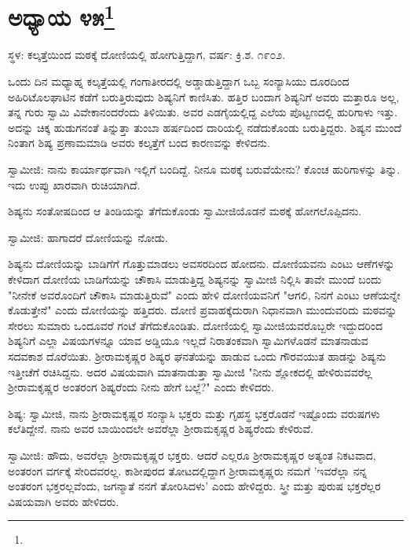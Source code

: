 \newpage

\chapter[ಅಧ್ಯಾಯ ೪೫]{ಅಧ್ಯಾಯ ೪೫\protect\footnote{}}

\begin{center}
ಸ್ಥಳ: ಕಲ್ಕತ್ತೆಯಿಂದ ಮಠಕ್ಕೆ ದೋಣಿಯಲ್ಲಿ ಹೋಗುತ್ತಿದ್ದಾಗ, ವರ್ಷ: ಕ್ರಿ.ಶ. ೧೯೦೨.
\end{center}

ಒಂದು ದಿನ ಮಧ್ಯಾಹ್ನ ಕಲ್ಕತ್ತೆಯಲ್ಲಿ ಗಂಗಾತೀರದಲ್ಲಿ ಅಡ್ಡಾಡುತ್ತಿದ್ದಾಗ ಒಬ್ಬ ಸಂನ್ಯಾಸಿಯು ದೂರದಿಂದ ಅಹಿರಿಟೊಲಘಾಟಿನ ಕಡೆಗೆ ಬರುತ್ತಿರುವುದು ಶಿಷ್ಯನಿಗೆ ಕಾಣಿಸಿತು. ಹತ್ತಿರ ಬಂದಾಗ ಶಿಷ್ಯನಿಗೆ ಅವರು ಮತ್ತಾರೂ ಅಲ್ಲ, ತನ್ನ ಗುರು ಸ್ವಾಮಿ ವಿವೇಕಾನಂದರೆಂದು ತಿಳಿಯಿತು. ಅವರ ಎಡಗೈಯಲ್ಲಿದ್ದ ಎಲೆಯ ಪೊಟ್ಟಣದಲ್ಲಿ ಹುರಿಗಾಳು ಇತ್ತು. ಅದನ್ನು ಚಿಕ್ಕ ಹುಡುಗನಂತೆ ತಿನ್ನುತ್ತಾ ತುಂಬಾ ಹರ್ಷದಿಂದ ದಾರಿಯಲ್ಲಿ ನಡೆದುಕೊಂಡು ಬರುತ್ತಿದ್ದರು. ಶಿಷ್ಯನ ಮುಂದೆ ನಿಂತಾಗ ಶಿಷ್ಯ ಪ್ರಣಾಮಮಾಡಿ ಅವರು ಕಲ್ಕತ್ತೆಗೆ ಬಂದ ಕಾರಣವನ್ನು ಕೇಳಿದನು.

ಸ್ವಾಮೀಜಿ: ನಾನು ಕಾರ್ಯಾರ್ಥವಾಗಿ ಇಲ್ಲಿಗೆ ಬಂದಿದ್ದೆ. ನೀನೂ ಮಠಕ್ಕೆ ಬರುವೆಯೇನು? ಕೊಂಚ ಹುರಿಗಾಳನ್ನು ತಿನ್ನು. ಇದು ಉಪ್ಪು ಖಾರವಾಗಿ ರುಚಿಯಾಗಿದೆ.

ಶಿಷ್ಯನು ಸಂತೋಷದಿಂದ ಆ ತಿಂಡಿಯನ್ನು ತೆಗೆದುಕೊಂಡು ಸ್ವಾಮೀಜಿಯೊಡನೆ ಮಠಕ್ಕೆ ಹೋಗಲೊಪ್ಪಿದನು.

ಸ್ವಾಮೀಜಿ: ಹಾಗಾದರೆ ದೋಣಿಯನ್ನು ನೋಡು.

ಶಿಷ್ಯನು ದೋಣಿಯನ್ನು ಬಾಡಿಗೆಗೆ ಗೊತ್ತುಮಾಡಲು ಅವಸರದಿಂದ ಹೋದನು. ದೋಣಿಯವನು ಎಂಟು ಆಣೆಗಳನ್ನು ಕೇಳಿದಾಗ ದೋಣಿಯ ಬಾಡಿಗೆಯನ್ನು ಚೌಕಾಸಿ ಮಾಡುತ್ತಿದ್ದ ಶಿಷ್ಯನನ್ನು ಸ್ವಾಮೀಜಿ ನಿಲ್ಲಿಸಿ ತಾವೇ ಮುಂದೆ ಬಂದು "ನೀನೇಕೆ ಅವರೊಂದಿಗೆ ಚೌಕಾಸಿ ಮಾಡುತ್ತಿರುವೆ" ಎಂದು ಹೇಳಿ ದೋಣಿಯವನಿಗೆ "ಆಗಲಿ, ನಿನಗೆ ಎಂಟು ಆಣೆಯನ್ನೇ ಕೊಡುತ್ತೇನೆ" ಎಂದು ದೋಣಿಯನ್ನು ಹತ್ತಿದರು. ದೋಣಿ ಪ್ರವಾಹಕ್ಕೆದುರಾಗಿ ನಿಧಾನವಾಗಿ ಮುಂದುವರಿದು ಮಠವನ್ನು ಸೇರಲು ಸುಮಾರು ಒಂದೂವರೆ ಗಂಟೆ ತೆಗೆದುಕೊಂಡಿತು. ದೋಣಿಯಲ್ಲಿ ಸ್ವಾಮೀಜಿಯವರೊಬ್ಬರೇ ಇದ್ದುದರಿಂದ ಶಿಷ್ಯನಿಗೆ ಎಲ್ಲಾ ವಿಷಯಗಳನ್ನೂ ಯಾವ ಅಡ್ಡಿಯೂ ಇಲ್ಲದೆ ನಿರಾತಂಕವಾಗಿ ಸ್ವಾಮಿಗಳೊಡನೆ ಮಾತನಾಡುವ ಸದವಕಾಶ ದೊರೆಯಿತು. ಶ‍್ರೀರಾಮಕೃಷ್ಣರ ಶಿಷ್ಯರ ಘನತೆಯನ್ನು ಹಾಡುವ ಒಂದು ಗೌರವಯುತ ಹಾಡನ್ನು ಶಿಷ್ಯನು ಇತ್ತೀಚೆಗೆ ರಚಿಸಿದ್ದನು. ಅದರ ವಿಷಯವಾಗಿ ಮಾತನಾಡುತ್ತಾ ಸ್ವಾಮೀಜಿ "ನೀನು ಶ್ಲೋಕದಲ್ಲಿ ಹೇಳಿರುವವರೆಲ್ಲ ಶ‍್ರೀರಾಮಕೃಷ್ಣರ ಅಂತರಂಗ ಶಿಷ್ಯರೆಂದು ನೀನು ಹೇಗೆ ಬಲ್ಲೆ?" ಎಂದು ಕೇಳಿದರು.

ಶಿಷ್ಯ: ಸ್ವಾಮೀಜಿ, ನಾನು ಶ‍್ರೀರಾಮಕೃಷ್ಣರ ಸಂನ್ಯಾಸಿ ಭಕ್ತರು ಮತ್ತು ಗೃಹಸ್ಥ ಭಕ್ತರೊಡನೆ ಇಷ್ಟೊಂದು ವರುಷಗಳು ಕಲೆತಿದ್ದೇನೆ. ನಾನು ಅವರ ಬಾಯಿಂದಲೇ ಅವರೆಲ್ಲಾ ಶ‍್ರೀರಾಮಕೃಷ್ಣರ ಶಿಷ್ಯರೆಂದು ಕೇಳಿರುವೆ.

ಸ್ವಾಮೀಜಿ: ಹೌದು, ಅವರೆಲ್ಲಾ ಶ‍್ರೀರಾಮಕೃಷ್ಣರ ಭಕ್ತರು. ಆದರೆ ಎಲ್ಲರೂ ಶ‍್ರೀರಾಮಕೃಷ್ಣರ ಅತ್ಯಂತ ನಿಕಟವಾದ, ಅಂತರಂಗ ವರ್ಗಕ್ಕೆ ಸೇರಿದವರಲ್ಲ. ಕಾಶೀಪುರದ ತೋಟದಲ್ಲಿದ್ದಾಗ ಶ‍್ರೀರಾಮಕೃಷ್ಣರು ನಮಗೆ 'ಇವರೆಲ್ಲಾ ನನ್ನ ಅಂತರಂಗ ಭಕ್ತರಲ್ಲವೆಂದು, ಜಗನ್ಮಾತೆ ನನಗೆ ತೋರಿಸಿದಳು' ಎಂದು ಹೇಳಿದ್ದರು. ಸ್ತ್ರೀ ಮತ್ತು ಪುರುಷ ಭಕ್ತರೆಲ್ಲರ ವಿಷಯವಾಗಿ ಅವರು ಹೇಳಿದರು.

